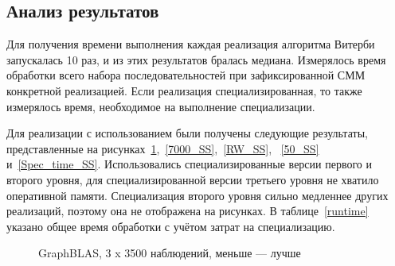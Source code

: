 \subsection{Анализ результатов}
Для получения времени выполнения каждая реализация алгоритма 
Витерби запускалась 10 раз, и из этих результатов бралась 
медиана.
Измерялось время обработки всего набора последовательностей при зафиксированной СММ конкретной реализацией.
Если реализация специализированная, то также измерялось время, необходимое на выполнение специализации.

Для реализации с использованием  были получены следующие результаты, представленные на рисунках~\ref{3500_SS},~\ref{7000_SS},~\ref{RW_SS},
~\ref{50_SS} и~\ref{Spec_time_SS}.
Использовались специализированные версии первого и второго уровня, для специализированной версии третьего уровня не хватило оперативной памяти.
Специализация второго уровня сильно медленнее других реализаций, поэтому она не отображена на рисунках.
В таблице~\ref{runtime} указано общее время обработки с учётом затрат на специализацию.


\begin{figure}[!h]
\centering
    \caption{GraphBLAS, 3 x 3500 наблюдений, меньше --- лучше}
\label{3500_SS}
\end{figure}

